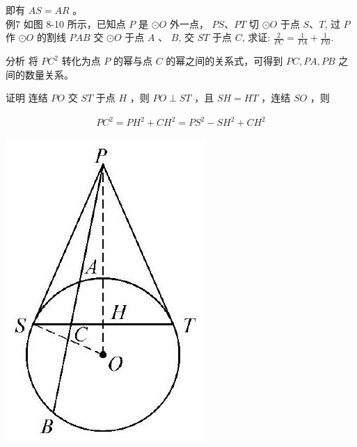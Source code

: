 \documentclass[10pt]{article}
\begin{document}
即有 $A S=A R$ 。\\
例7 如图 8-10 所示，已知点 $P$ 是 $\odot O$ 外一点， $P S 、 P T$ 切 $\odot O$ 于点 $S 、 T$, 过 $P$ 作 $\odot O$ 的割线 $P A B$ 交 $\odot O$ 于点 $A$ 、 $B$, 交 $S T$ 于点 $C$, 求证: $\frac{2}{P C}=\frac{1}{P A}+\frac{1}{P B}$.

分析 将 $P C^{2}$ 转化为点 $P$ 的幂与点 $C$ 的幂之间的关系式，可得到 $P C, P A, P B$ 之间的数量关系。

证明 连结 $P O$ 交 $S T$ 于点 $H$ ，则 $P O \perp S T$ ，且 $S H=H T$ ，连结 $S O$ ，则

\begin{align*}
P C^{2}=P H^{2}+C H^{2}=P S^{2}-S H^{2}+C H^{2}
\end{align*}

\begin{center}
\includegraphics[max width=\textwidth]{2024_10_30_66b8e5e701da2093c133g-061}
\end{center}
\end{document}
